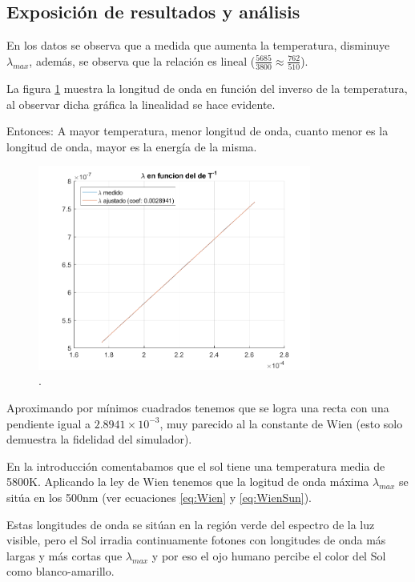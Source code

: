 \documentclass[a4paper]{article}
\begin{document}
\subsection{Exposición de resultados y análisis}

En los datos se observa que a medida que aumenta la temperatura, disminuye $\lambda_{max}$, además, se observa que la relación es lineal ($\frac{5685}{3800} \approx \frac{762}{510}$).

La figura \ref{fig:wien1} muestra la longitud de onda en función del inverso de la temperatura, al observar dicha gráfica la linealidad se hace evidente.

Entonces: A mayor temperatura, menor longitud de onda, cuanto menor es la longitud de onda, mayor es la energía de la misma.

\begin{figure}[h!]
\centering
\includegraphics[width=0.8\textwidth]{assets/Wien.png}
\caption{\label{fig:wien1}.}
\end{figure}

Aproximando por mínimos cuadrados tenemos que se logra una recta con una pendiente igual a $2.8941 \times 10^{-3}$, muy parecido al la constante de Wien (esto solo demuestra la fidelidad del simulador).

En la introducción comentabamos que el sol tiene una temperatura media de 5800K. Aplicando la ley de Wien tenemos que la logitud de onda máxima $\lambda_{max}$ se sitúa en los 500nm (ver ecuaciones \ref{eq:Wien} y \ref{eq:WienSun}).

Estas longitudes de onda se sitúan en la región verde del espectro de la luz visible, pero el Sol irradia continuamente fotones con longitudes de onda más largas y más cortas que $\lambda_{max}$ y por eso el ojo humano percibe el color del Sol como blanco-amarillo.
\end{document}
